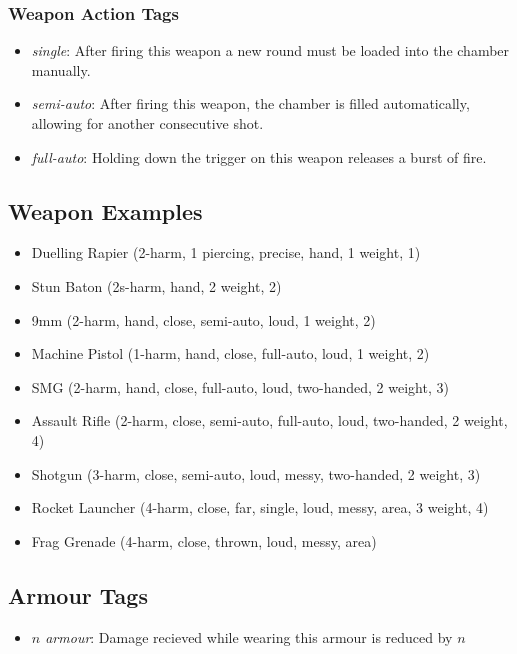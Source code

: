 \subsubsection{Weapon Action Tags}
\begin{itemize}
\item \textit{single}: After firing this weapon a new round must be loaded into the chamber manually.
\item \textit{semi-auto}: After firing this weapon, the chamber is filled automatically, allowing for another consecutive shot.
\item \textit{full-auto}: Holding down the trigger on this weapon releases a burst of fire.
\end{itemize}

\subsection{Weapon Examples}
\begin{itemize}
\item Duelling Rapier (2-harm, 1 piercing, precise, hand, 1 weight, 1\money)
\item Stun Baton (2s-harm, hand, 2 weight, 2\money)
\item 9mm (2-harm, hand, close, semi-auto, loud, 1 weight, 2\money)
\item Machine Pistol (1-harm, hand, close, full-auto, loud, 1 weight, 2\money)
\item SMG (2-harm, hand, close, full-auto, loud, two-handed, 2 weight, 3\money)
\item Assault Rifle (2-harm, close, semi-auto, full-auto, loud, two-handed, 2 weight, 4\money)
\item Shotgun (3-harm, close, semi-auto, loud, messy, two-handed, 2 weight, 3\money)
\item Rocket Launcher (4-harm, close, far, single, loud, messy, area, 3 weight, 4\money)
\item Frag Grenade (4-harm, close, thrown, loud, messy, area)
\end{itemize}

\subsection{Armour Tags}
\begin{itemize}
\item \textit{$n$ armour}: Damage recieved while wearing this armour is reduced by $n$
\end{itemize}